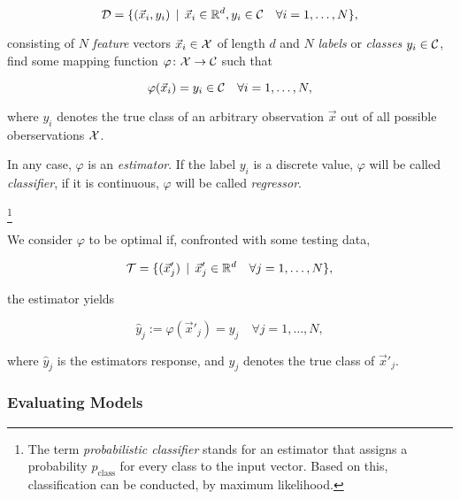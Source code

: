 \begin{equation}
\mathcal{D} = \{ (\vec x_i, y_i) \, \mid \, \vec x_i \in \mathbb{R}^d, y_i \in \mathcal{C} \quad \forall i = 1,\ldots,N \},
\end{equation}

consisting of $N$ \emph{feature} vectors $\vec x_i \in \mathcal{X}$ of length $d$ and $N$ \emph{labels} or \emph{classes} $y_i \in \mathcal{C}$, find some mapping function $\varphi \colon \mathcal{X} \to \mathcal{C}$ such that

\begin{equation}
\varphi(\vec x_i) = y_i \in \mathcal{C} \quad \forall i = 1,\ldots,N,
\end{equation}

where $y_i$ denotes the true class of an arbitrary observation $\vec x$ out of all possible oberservations $\mathcal{X}$.

\begin{definition}[Estimators]
In any case, $\varphi$ is an \emph{estimator}. If the label $y_i$ is a discrete value, $\varphi$ will be called \emph{classifier}, if it is continuous, $\varphi$ will be called \emph{regressor}.
\end{definition}\footnote{The term \emph{probabilistic classifier} stands for an estimator that assigns a probability $p_{\text{class}}$ for every class to the input vector. Based on this, classification can be conducted, \eg by maximum likelihood.}

We consider $\varphi$ to be optimal if, confronted with some testing data,

\begin{equation}
\mathcal{T} = \{ (\vec x'_j) \, \mid \, \vec x'_j \in \mathbb{R}^d \quad \forall j = 1,\ldots,N \},
\end{equation}

the estimator yields

\begin{equation}
\hat y_j := \varphi({\vec x'_j}) = y_j \quad \forall j = 1,\ldots,N,
\end{equation}

where $\hat y_j$ is the estimators response, and $y_j$ denotes the true class of $\vec x'_j$.

\subsubsection{Evaluating Models}


